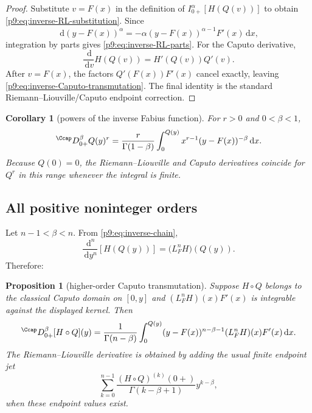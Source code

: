 \documentclass[11pt,oneside]{article}
\newtheorem{proposition}[theorem]{Proposition}
\newtheorem{corollary}[theorem]{Corollary}
\theoremstyle{definition}
\theoremstyle{remark}
\newcommand{\dd}{\,\mathrm d}
\newcommand{\1}{\mathbf 1}
\begin{document}
\begin{proof}
Substitute $v=F(x)$ in the definition of $I_{0+}^\alpha[H(Q(v))]$ to obtain
\cref{p9:eq:inverse-RL-substitution}.  Since
\[
 \dd (y-F(x))^\alpha
 =-\alpha(y-F(x))^{\alpha-1}F'(x)\dd x,
\]
integration by parts gives \cref{p9:eq:inverse-RL-parts}.
For the Caputo derivative,
\[
 \frac{\dd}{\dd v}H(Q(v))=H'(Q(v))Q'(v).
\]
After $v=F(x)$, the factors $Q'(F(x))F'(x)$ cancel exactly, leaving
\cref{p9:eq:inverse-Caputo-transmutation}.  The final identity is the standard
Riemann--Liouville/Caputo endpoint correction.
\end{proof}

\begin{corollary}[powers of the inverse Fabius function]
For $r>0$ and $0<\beta<1$,
\begin{equation}
 {}^{\Ccap}D_{0+}^\beta Q(y)^r
 =\frac{r}{\Gamma(1-\beta)}
   \int_0^{Q(y)}x^{r-1}(y-F(x))^{-\beta}\dd x.
 \label{p9:eq:Caputo-Q-power}
\end{equation}
Because $Q(0)=0$, the Riemann--Liouville and Caputo derivatives coincide for
$Q^r$ in this range whenever the integral is finite.
\end{corollary}

\subsection{All positive noninteger orders}

Let $n-1<\beta<n$.  From \cref{p9:eq:inverse-chain},
\begin{equation}
 \frac{\dd^n}{\dd y^n}[H(Q(y))]
 =\bigl(L_F^nH\bigr)(Q(y)).
\end{equation}
Therefore:

\begin{proposition}[higher-order Caputo transmutation]
Suppose $H\circ Q$ belongs to the classical Caputo domain on $[0,y]$ and
$(L_F^nH)(x)F'(x)$ is integrable against the displayed kernel.  Then
\begin{equation}
 {}^{\Ccap}D_{0+}^\beta[H\circ Q](y)
 =\frac1{\Gamma(n-\beta)}
  \int_0^{Q(y)}(y-F(x))^{n-\beta-1}
  (L_F^nH)(x)F'(x)\dd x.
 \label{p9:eq:higher-Caputo-transmutation}
\end{equation}
The Riemann--Liouville derivative is obtained by adding the usual finite
endpoint jet
\begin{equation}
 \sum_{k=0}^{n-1}
 \frac{(H\circ Q)^{(k)}(0+)}{\Gamma(k-\beta+1)}y^{k-\beta},
 \label{p9:eq:higher-RL-jet}
\end{equation}
when these endpoint values exist.
\end{proposition}
\end{document}
